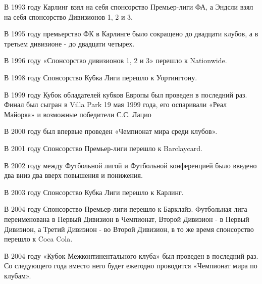 В 1993 году Карлинг взял на себя спонсорство Премьер-лиги ФА, а Эндсли взял на себя спонсорство Дивизионов 1, 2 и 3.

В 1995 году премьерство ФК в Карлинге было сокращено до двадцати клубов, а в третьем дивизионе - до двадцати четырех.

В 1996 году «Спонсорство дивизионов 1, 2 и 3» перешло к Nationwide.

В 1998 году Спонсорство Кубка Лиги перешло к Уортингтону.

В 1999 году Кубок обладателей кубков Европы был проведен в последний раз. Финал был сыгран в Villa Park 19 мая 1999 года, его оспаривали «Реал Майорка» и возможные победители С.С. Лацио

В 2000 году  был впервые проведен «Чемпионат мира среди клубов».

В 2001 году Спонсорство Премьер-лиги перешло к Barclaycard.

В 2002 году между Футбольной лигой и Футбольной конференцией было введено два вниз два вверх повышения и понижения.

В 2003 году Спонсорство Кубка Лиги перешло к Карлинг.

В 2004 году Спонсорство Премьер-лиги перешло к Барклайз. Футбольная лига переименована в Первый Дивизион в Чемпионат, Второй Дивизион - в Первый Дивизион, а Третий Дивизион - во Второй Дивизион, в то же время спонсорство перешло к Coca Cola.

В 2004 году «Кубок Межконтинентального клуба» был проведен в последний раз. Со следующего года вместо него будет ежегодно проводится «Чемпионат мира по клубам». \cite{fhist}